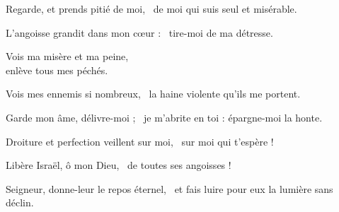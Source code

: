 \item Regarde, et prends pitié de moi,~\psstar{} de moi qui suis seul et misérable.

\item L'angoisse grandit dans mon cœur :~\psstar{} tire-moi de ma détresse.

\item Vois ma misère et ma peine,~\psstar{} \\enlève tous mes péchés.

\item Vois mes ennemis si nombreux,~\psstar{} la haine violente qu'ils me portent.

\item Garde mon âme, délivre-moi ;~\psstar{} je m'abrite en toi : épargne-moi la honte.

\item Droiture et perfection veillent sur moi,~\psstar{} sur moi qui t'espère !

\item Libère Israël, ô mon Dieu,~\psstar{} de toutes ses angoisses !

\item Seigneur, donne-leur le repos éternel,~\psstar{} et fais luire pour eux la lumière sans déclin.